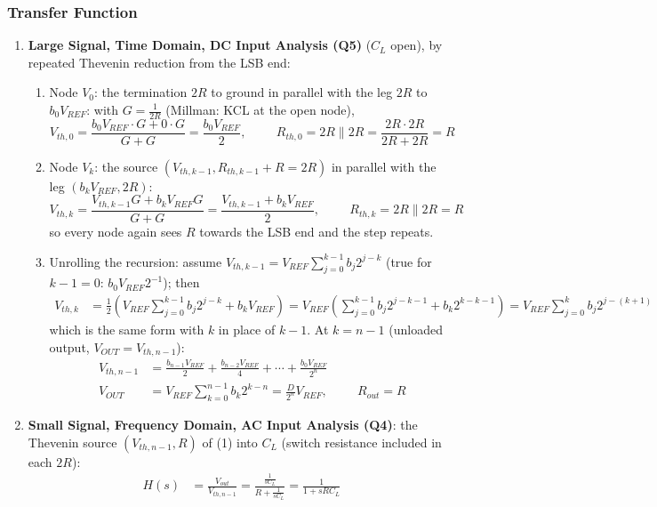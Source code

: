 \subsubsection{Transfer Function}
\begin{enumerate}
  \item \textbf{Large Signal, Time Domain, DC Input Analysis (Q5)} (\(C_L\) open), by repeated
    Thevenin reduction from the LSB end:
\begin{enumerate}
  \item Node \(V_0\): the termination \(2R\) to ground in parallel with the leg
    \(2R\) to \(b_0 V_{REF}\):
    with \(G = \frac{1}{2R}\) (Millman: KCL at the open node),
    \[
      V_{th,0} = \frac{b_0 V_{REF} \cdot G + 0 \cdot G}{G + G} = \frac{b_0 V_{REF}}{2}, \hspace{1cm} R_{th,0} = 2R \parallel 2R = \frac{2R \cdot 2R}{2R + 2R} = R
    \]
  \item Node \(V_k\): the source \((V_{th,k-1}, R_{th,k-1} + R = 2R)\) in parallel
    with the leg \((b_k V_{REF}, 2R)\):
    \[
      V_{th,k} = \frac{V_{th,k-1} G + b_k V_{REF} G}{G + G} = \frac{V_{th,k-1} + b_k V_{REF}}{2}, \hspace{1cm} R_{th,k} = 2R \parallel 2R = R
    \]
    so every node again sees \(R\) towards the LSB end and the step repeats.
  \item Unrolling the recursion: assume
    \(V_{th,k-1} = V_{REF}\sum_{j=0}^{k-1} b_j 2^{j-k}\) (true for \(k - 1 = 0\):
    \(b_0 V_{REF} 2^{-1}\)); then
    \begin{align*}
      V_{th,k} &= \frac{1}{2}\left(V_{REF}\sum_{j=0}^{k-1} b_j 2^{j-k} + b_k V_{REF}\right)
      = V_{REF}\left(\sum_{j=0}^{k-1} b_j 2^{j-k-1} + b_k 2^{k-k-1}\right)
      = V_{REF}\sum_{j=0}^{k} b_j 2^{j-(k+1)}
    \end{align*}
    which is the same form with \(k\) in place of \(k - 1\). At \(k = n - 1\)
    (unloaded output, \(V_{OUT} = V_{th,n-1}\)):
    \begin{align*}
      V_{th,n-1} &= \frac{b_{n-1}V_{REF}}{2} + \frac{b_{n-2}V_{REF}}{4} + \cdots + \frac{b_0 V_{REF}}{2^n} \\
      V_{OUT} &= V_{REF} \sum_{k=0}^{n-1} b_k 2^{k - n} = \frac{D}{2^n} V_{REF}, \hspace{1cm} R_{out} = R \tag{1}
    \end{align*}
\end{enumerate}
  \item \textbf{Small Signal, Frequency Domain, AC Input Analysis (Q4)}: the Thevenin source
    \((V_{th,n-1}, R)\) of (1) into \(C_L\) (switch resistance included in each \(2R\)):
    \begin{align*}
      H(s) &= \frac{V_{out}}{V_{th,n-1}} = \frac{\frac{1}{sC_L}}{R + \frac{1}{sC_L}} = \frac{1}{1 + sRC_L} \tag{2}
    \end{align*}
\end{enumerate}

